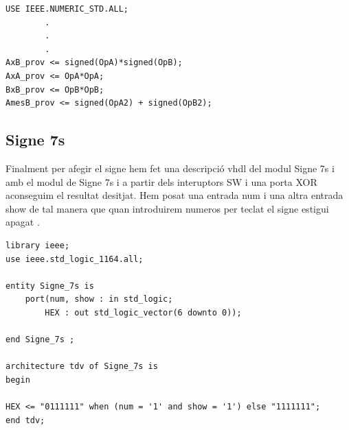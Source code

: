 \documentclass[12pt, a4papre]{article}
\begin{document}
\begin{lstlisting}[style=vhdl, frame=single, basicstyle=\tiny]
USE IEEE.NUMERIC_STD.ALL;
		.
		.
		.
AxB_prov <= signed(OpA)*signed(OpB);
AxA_prov <= OpA*OpA;
BxB_prov <= OpB*OpB;
AmesB_prov <= signed(OpA2) + signed(OpB2);
\end{lstlisting}

\subsection{Signe 7s}
	Finalment per afegir el signe hem fet una descripció vhdl del modul Signe 7s i amb el modul de Signe 7s i a partir dels interuptors SW i una porta XOR aconseguim el resultat desitjat. Hem posat una entrada num i una altra entrada show de tal manera que quan introduirem numeros per teclat el signe estigui apagat .

	\begin{lstlisting}[style=vhdl, frame=single, basicstyle=\tiny]
library ieee;
use ieee.std_logic_1164.all;

entity Signe_7s is 
	port(num, show : in std_logic;
		HEX : out std_logic_vector(6 downto 0));
		
end Signe_7s ;

architecture tdv of Signe_7s is
begin

HEX <= "0111111" when (num = '1' and show = '1') else "1111111";
end tdv;
\end{lstlisting}
\end{document}
